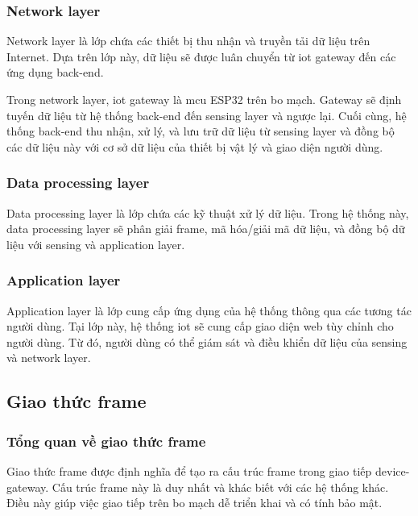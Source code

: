 \subsubsection{Network layer}

Network layer là lớp chứa các thiết bị thu nhận và truyền tải dữ liệu trên Internet. Dựa trên lớp này, dữ liệu sẽ được luân chuyển từ \acrshort{iot} gateway đến các ứng dụng back-end.

Trong network layer, \acrshort{iot} gateway là \acrshort{mcu} ESP32 trên bo mạch. Gateway sẽ định tuyến dữ liệu từ hệ thống back-end đến sensing layer và ngược lại. Cuối cùng, hệ thống back-end thu nhận, xử lý, và lưu trữ dữ liệu từ sensing layer và đồng bộ các dữ liệu này với cơ sở dữ liệu của thiết bị vật lý và giao diện người dùng.

\subsubsection{Data processing layer}

Data processing layer là lớp chứa các kỹ thuật xử lý dữ liệu. Trong hệ thống này, data processing layer sẽ phân giải frame, mã hóa/giải mã dữ liệu, và đồng bộ dữ liệu với sensing và application layer.

\subsubsection{Application layer}

Application layer là lớp cung cấp ứng dụng của hệ thống thông qua các tương tác người dùng. Tại lớp này, hệ thống \acrshort{iot} sẽ cung cấp giao diện web tùy chỉnh cho người dùng. Từ đó, người dùng có thể giám sát và điều khiển dữ liệu của sensing và network layer.

\subsection{Giao thức frame}
\label{Frame-Protocol-subsec}

\subsubsection{Tổng quan về giao thức frame}

Giao thức frame được định nghĩa để tạo ra cấu trúc frame trong giao tiếp device-gateway. Cấu trúc frame này là duy nhất và khác biết với các hệ thống khác. Điều này giúp việc giao tiếp trên bo mạch dễ triển khai và có tính bảo mật.

